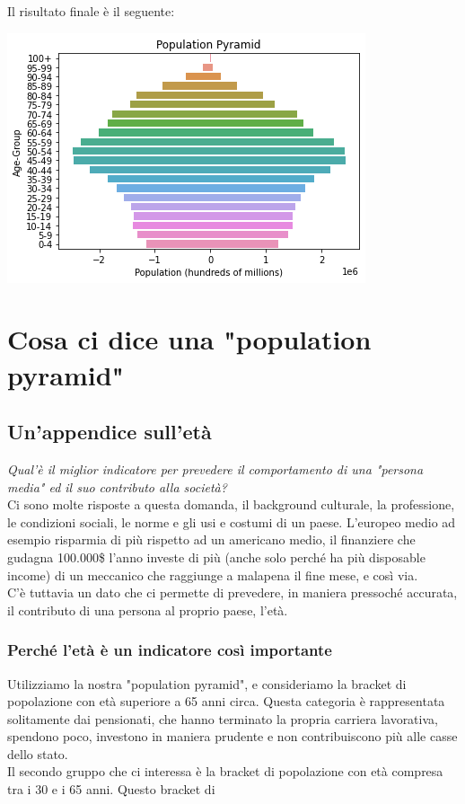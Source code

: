 \documentclass[11pt, oneside]{article}   	%
\begin{document}
Il risultato finale è il seguente:
\begin{center}
\includegraphics[scale=1]{popitaly5}
\end{center}

\section{Cosa ci dice una "population pyramid"}
\subsection{Un'appendice sull'età}
\emph{Qual'è il miglior indicatore per prevedere il comportamento di una "persona media" ed il suo contributo alla società?}\\
Ci sono molte risposte a questa domanda, il background culturale, la professione, le condizioni sociali, le norme e gli usi e costumi di un paese. L'europeo medio ad esempio risparmia di più rispetto ad un americano medio, il finanziere che gudagna 100.000\$ l'anno investe di più (anche solo perché ha più disposable income) di un meccanico che raggiunge a malapena il fine mese, e così via.\\
C'è tuttavia un dato che ci permette di prevedere, in maniera pressoché accurata, il contributo di una persona al proprio paese, l'età.

\subsubsection{Perché l'età è un indicatore così importante}
Utilizziamo la nostra "population pyramid", e consideriamo la bracket di popolazione con età superiore a 65 anni circa. Questa categoria è rappresentata solitamente dai pensionati, che hanno terminato la propria carriera lavorativa, spendono poco, investono in maniera prudente e non contribuiscono più alle casse dello stato. \\

Il secondo gruppo che ci interessa è la bracket di popolazione con età compresa tra i 30 e i 65 anni. Questo bracket di 
\end{document}
